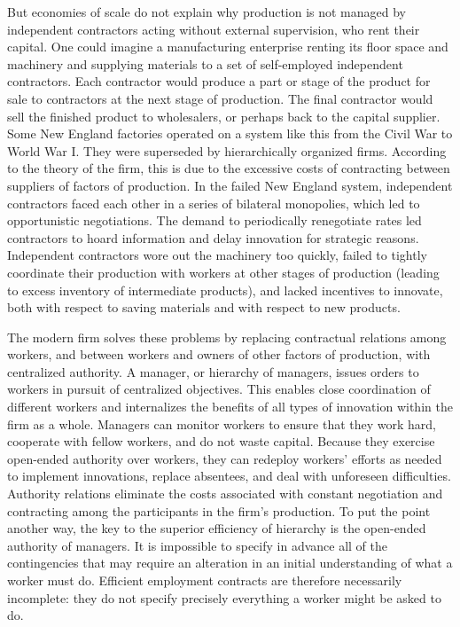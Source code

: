 \documentclass[
  letterpaper,
  11pt,
  DIV=9,
  openright]{scrbook}
\begin{document}
But economies of scale do not explain why production is not managed by
independent contractors acting without external supervision, who rent
their capital. One could imagine a manufacturing enterprise renting its
floor space and machinery and supplying materials to a set of
self-employed independent contractors. Each contractor would produce a
part or stage of the product for sale to contractors at the next stage
of production. The final contractor would sell the finished product to
wholesalers, or perhaps back to the capital supplier. Some New England
factories operated on a system like this from the Civil War to World War
I. They were superseded by hierarchically organized firms. According to
the theory of the firm, this is due to the excessive costs of
contracting between suppliers of factors of production. In the failed
New England system, independent contractors faced each other in a series
of bilateral monopolies, which led to opportunistic negotiations. The
demand to periodically renegotiate rates led contractors to hoard
information and delay innovation for strategic reasons. Independent
contractors wore out the machinery too quickly, failed to tightly
coordinate their production with workers at other stages of production
(leading to excess inventory of intermediate products), and lacked
incentives to innovate, both with respect to saving materials and with
respect to new products.

The modern firm solves these problems by replacing contractual relations
among workers, and between workers and owners of other factors of
production, with centralized authority. A manager, or hierarchy of
managers, issues orders to workers in pursuit of centralized objectives.
This enables close coordination of different workers and internalizes
the benefits of all types of innovation within the firm as a whole.
Managers can monitor workers to ensure that they work hard, cooperate
with fellow workers, and do not waste capital. Because they exercise
open-ended authority over workers, they can redeploy workers' efforts as
needed to implement innovations, replace absentees, and deal with
unforeseen difficulties. Authority relations eliminate the costs
associated with constant negotiation and contracting among the
participants in the firm's production. To put the point another way, the
key to the superior efficiency of hierarchy is the open-ended authority
of managers. It is impossible to specify in advance all of the
contingencies that may require an alteration in an initial understanding
of what a worker must do. Efficient employment contracts are therefore
necessarily incomplete: they do not specify precisely everything a
worker might be asked to do.
\end{document}
